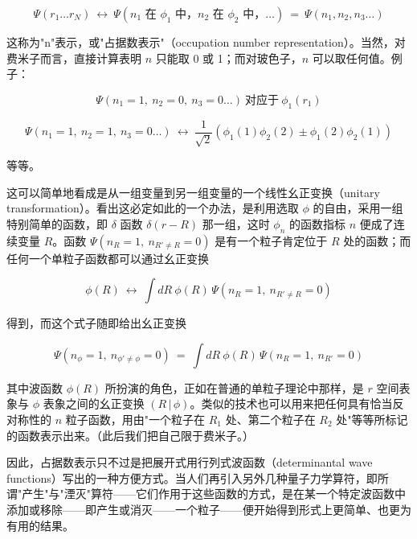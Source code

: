 \begin{equation*}
\Psi(r_1\ldots r_N)\ \longleftrightarrow\ \Psi(n_1 \text{ 在 } \phi_1 \text{ 中，} n_2 \text{ 在 } \phi_2 \text{ 中，} \ldots)\ =\ \Psi(n_1,n_2,n_3\ldots)
\end{equation*}

这称为"n"表示，或"占据数表示"（occupation number representation）。当然，对费米子而言，直接计算表明 $n$ 只能取 0 或 1；而对玻色子，$n$ 可以取任何值。例子：

\begin{equation*}
\Psi(n_1=1,\ n_2=0,\ n_3=0\ldots)\ \text{对应于}\ \phi_1(r_1)
\end{equation*}

\begin{equation*}
\Psi(n_1=1,\ n_2=1,\ n_3=0\ldots)\ \longleftrightarrow\ \frac{1}{\sqrt{2}}\left(\phi_1(1)\phi_2(2)\pm\phi_1(2)\phi_2(1)\right)
\end{equation*}

等等。

这可以简单地看成是从一组变量到另一组变量的一个线性幺正变换（unitary transformation）。看出这必定如此的一个办法，是利用选取 $\phi$ 的自由，采用一组特别简单的函数，即 $\delta$ 函数 $\delta(r-R)$ 那一组，这时 $\phi_n$ 的函数指标 $n$ 便成了连续变量 $R$。函数 $\Psi(n_R=1,\ n_{R'\neq R}=0)$ 是有一个粒子肯定位于 $R$ 处的函数；而任何一个单粒子函数都可以通过幺正变换

\begin{equation*}
\phi(R)\ \longleftrightarrow\ \int dR\ \phi(R)\,\Psi(n_R=1,\ n_{R'\neq R}=0)
\end{equation*}

得到，而这个式子随即给出幺正变换

\begin{equation*}
\Psi(n_\phi=1,\ n_{\phi'\neq\phi}=0)\ =\ \int dR\ \phi(R)\,\Psi(n_R=1,\ n_{R'}=0)
\end{equation*}

其中波函数 $\phi(R)$ 所扮演的角色，正如在普通的单粒子理论中那样，是 $r$ 空间表象与 $\phi$ 表象之间的幺正变换 $(R\,|\,\phi)$。类似的技术也可以用来把任何具有恰当反对称性的 $n$ 粒子函数，用由"一个粒子在 $R_1$ 处、第二个粒子在 $R_2$ 处"等等所标记的函数表示出来。（此后我们把自己限于费米子。）

因此，占据数表示只不过是把展开式用行列式波函数（determinantal wave functions）写出的一种方便方式。当人们再引入另外几种量子力学算符，即所谓"产生"与"湮灭"算符——它们作用于这些函数的方式，是在某一个特定波函数中添加或移除——即产生或消灭——一个粒子——便开始得到形式上更简单、也更为有用的结果。

